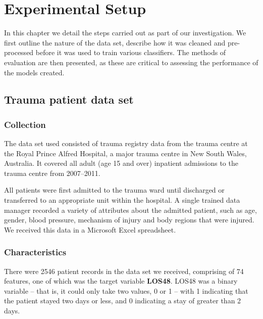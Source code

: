 \chapter{Experimental Setup} \label{chap:experiments}

In this chapter we detail the steps carried out as part of our investigation.
We first outline the nature of the data set, describe how it was cleaned and
pre-processed before it was used to train various classifiers. The methods of
evaluation are then presented, as these are critical to assessing the
performance of the models created.

\section{Trauma patient data set}

\subsection{Collection}
The data set used consisted of trauma registry data from the trauma centre
at the Royal Prince Alfred Hospital, a major trauma centre in New South Wales,
Australia. It covered all adult (age 15 and over) inpatient admissions to the
trauma centre from 2007--2011. 

All patients were first admitted to the trauma ward until discharged
or transferred to an appropriate unit within the hospital. A single trained
data manager recorded a variety of attributes about the admitted patient,
such as age, gender, blood pressure, mechanism of injury and body regions
that were injured. We received this data in a Microsoft Excel spreadsheet.

\subsection{Characteristics}
There were 2546 patient records in the data set we received, comprising of 74
features, one of which was the target variable \textbf{LOS48}. LOS48 was a
binary variable -- that is, it could only take two values, 0 or 1 -- with 1
indicating that the patient stayed two days or less, and 0 indicating a stay
of greater than 2 days.


